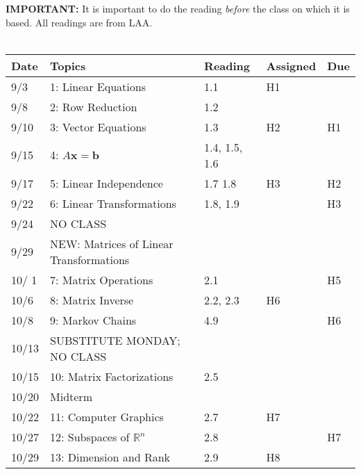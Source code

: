 \documentclass[11pt]{article}
\begin{document}
\textbf{IMPORTANT:} It is important to do the reading \emph{before} the class on
which it is based.   All readings are from LAA.
\\~\\
\small
\begin{centering}
\begin{tabular}{||l|p{3in}|l|l|l||}
\hline\hline
Date & Topics  & Reading & Assigned & Due  \\
\hline\hline
9/3 & 1: Linear Equations & 1.1 & H1  & \\
\hline

9/8 &  2: Row Reduction & 1.2  &  & \\
9/10 & 3: Vector Equations & 1.3 & H2 & H1 \\
\hline

9/15 & 4: $A\mathbf{x} =\mathbf{b}$  & 1.4, 1.5, 1.6 &  & \\
9/17 & 5: Linear Independence & 1.7 1.8 & H3 & H2 \\ %
\hline

9/22 & 6: Linear Transformations  & 1.8, 1.9 & & H3 \\
9/24 & NO CLASS & &&\\
\hline

9/29 &  NEW: Matrices of Linear Transformations &  & & \\
10/ 1 &7: Matrix Operations  & 2.1 & & H5\\ 
\hline

10/6 & 8: Matrix Inverse & 2.2, 2.3 & H6 &\\ 
10/8 & 9: Markov Chains & 4.9 & & H6 \\  
\hline

% 
10/13 & SUBSTITUTE MONDAY; NO CLASS &&&\\
10/15 & 10: Matrix Factorizations & 2.5 & & \\ %
\hline

10/20 & Midterm & & &\\
10/22 & 11: Computer Graphics & 2.7 & H7 &\\ 
\hline

10/27 & 12: Subspaces of $\mathbb{R}^n$ & 2.8 & & H7\\ 
10/29 & 13: Dimension and Rank & 2.9 & H8 &\\ 
\hline


\end{tabular}
\end{centering}
\end{document}
